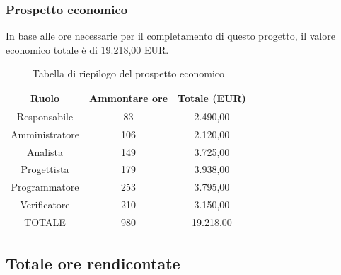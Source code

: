 \subsubsection{Prospetto economico}
In base alle ore necessarie per il completamento di questo progetto, il valore economico totale è di 19.218,00 EUR.
\begin{table}[h]
\caption{Tabella di riepilogo del prospetto economico}
\begin{center}
\begin{tabular}{ |c|c|c|  }
 \hline
 Ruolo 		& Ammontare ore 	& Totale (EUR)\\
 \hline
 \hline
 	Responsabile	& 83 		& 2.490,00\\
	Amministratore	& 106		& 2.120,00\\
	Analista		& 149 		& 3.725,00\\
	Progettista		& 179		& 3.938,00\\
	Programmatore	& 253		& 3.795,00\\
	Verificatore	& 210 		& 3.150,00\\
 \hline\hline
 TOTALE		& 980		& 19.218,00\\
  \hline
\end{tabular}
\end{center}
\end{table}

\newpage
\subsection{Totale ore rendicontate}

